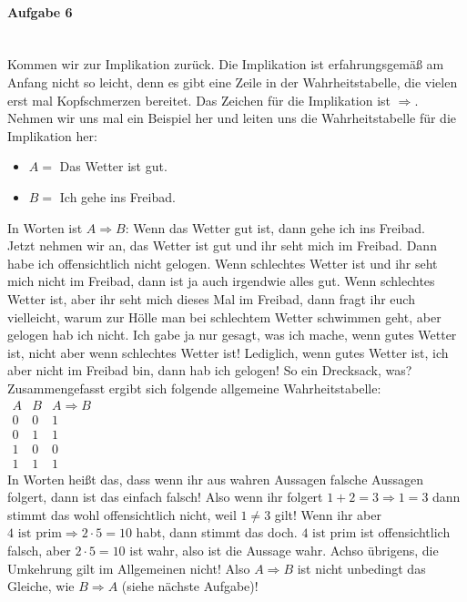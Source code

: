\documentclass[12pt,a4paper,ngerman]{scrartcl}
\begin{document}
	\paragraph{Aufgabe 6}\mbox{}\\
	Kommen wir zur Implikation zurück. Die Implikation ist erfahrungsgemäß am Anfang nicht so leicht, denn es gibt eine Zeile in der Wahrheitstabelle, die vielen erst mal Kopfschmerzen bereitet.
	Das Zeichen für die Implikation ist $\Rightarrow$. Nehmen wir uns mal ein Beispiel her und leiten uns die Wahrheitstabelle für die Implikation her:
	\begin{itemize}
		\item[] $A = $ Das Wetter ist gut.
		\item[] $B = $ Ich gehe ins Freibad.
	\end{itemize}
	In Worten ist $A \Rightarrow B$: Wenn das Wetter gut ist, dann gehe ich ins Freibad.\\
	Jetzt nehmen wir an, das Wetter ist gut und ihr seht mich im Freibad. Dann habe ich offensichtlich nicht gelogen. Wenn schlechtes Wetter ist und ihr seht mich nicht im Freibad, dann ist ja auch irgendwie alles gut. Wenn schlechtes Wetter ist, aber ihr seht mich dieses Mal im Freibad, dann fragt ihr euch vielleicht, warum  zur Hölle man bei schlechtem Wetter schwimmen geht, aber gelogen hab ich nicht. Ich gabe ja nur gesagt, was ich mache, wenn gutes Wetter ist, nicht aber wenn schlechtes Wetter ist! Lediglich, wenn gutes Wetter ist, ich aber nicht im Freibad bin, dann hab ich gelogen! So ein Drecksack, was?\\
	Zusammengefasst ergibt sich folgende allgemeine Wahrheitstabelle:\\
	$\begin{array}{cc|c}
		A & B & A \Rightarrow B\\
		\hline
		0 & 0 & 1\\
		0 & 1 & 1\\
		1 & 0 & 0\\
		1 & 1 & 1
	\end{array}$\\
	In Worten heißt das, dass wenn ihr aus wahren Aussagen falsche Aussagen folgert, dann ist das einfach falsch! Also wenn ihr folgert $1+2=3 \Rightarrow 1=3$ dann stimmt das wohl offensichtlich nicht, weil $1 \ne 3$ gilt! Wenn ihr aber $4 \text{ ist prim} \Rightarrow 2 \cdot 5 = 10$ habt, dann stimmt das doch. $4 \text{ ist prim}$ ist offensichtlich falsch, aber $2 \cdot 5 = 10$ ist wahr, also ist die Aussage wahr. Achso übrigens, die Umkehrung gilt im Allgemeinen nicht! Also $A \Rightarrow B$ ist nicht unbedingt das Gleiche, wie $B \Rightarrow A$ (siehe nächste Aufgabe)!
\end{document}
